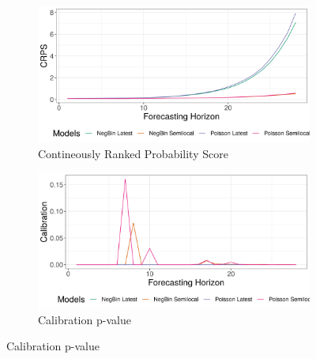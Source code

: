 \begin{figure}[H]
\begin{subfigure}{0.5\textwidth}
  \centering
  \includegraphics[width=\linewidth]{../output/Mutwanga_crps.png}  
  \caption{Contineously Ranked Probability Score}
  \label{fig:sub-first}
\end{subfigure}
\begin{subfigure}{0.5\textwidth}
  \centering
  \includegraphics[width=\linewidth]{../output/Mutwanga_calibration.png}  
  \caption{Calibration p-value}
  \label{fig:sub-second}
\end{subfigure}


\end{figure}
